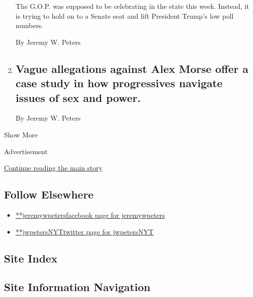 \begin{enumerate}
  The G.O.P. was supposed to be celebrating in the state this week.
  Instead, it is trying to hold on to a Senate seat and lift President
  Trump's low poll numbers.

  By Jeremy W. Peters
\item
  \href{/2020/08/23/us/elections/vague-allegations-against-alex-morse-offer-a-case-study-in-how-progressives-navigate-issues-of-sex-and-power.html}{}

  \hypertarget{vague-allegations-against-alex-morse-offer-a-case-study-in-how-progressives-navigate-issues-of-sex-and-power}{%
  \subsection{Vague allegations against Alex Morse offer a case study in
  how progressives navigate issues of sex and
  power.}\label{vague-allegations-against-alex-morse-offer-a-case-study-in-how-progressives-navigate-issues-of-sex-and-power}}

  By Jeremy W. Peters
\end{enumerate}

Show More

Advertisement

\protect\hyperlink{after-mid2}{Continue reading the main story}

\hypertarget{follow-elsewhere}{%
\subsection{Follow Elsewhere}\label{follow-elsewhere}}

\begin{itemize}
\tightlist
\item
  \href{https://www.facebookcorewwwi.onion/jeremywpeters}{**jeremywpetersfacebook
  page for jeremywpeters}
\item
  \href{https://twitter.com/jwpetersNYT}{**jwpetersNYTtwitter page for
  jwpetersNYT}
\end{itemize}

\hypertarget{site-index}{%
\subsection{Site Index}\label{site-index}}

\hypertarget{site-information-navigation}{%
\subsection{Site Information
Navigation}\label{site-information-navigation}}

